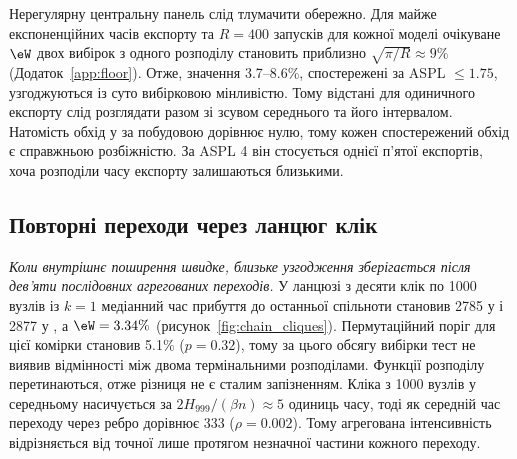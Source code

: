 Нерегулярну центральну панель слід тлумачити обережно. Для майже експоненційних часів експорту та $R=400$ запусків для кожної моделі очікуване $\eW$ двох вибірок з одного розподілу становить приблизно $\sqrt{\pi/R}\approx9\%$ (Додаток~\ref*{app:floor}). Отже, значення 3.7--8.6\%, спостережені за ASPL $\le1.75$, узгоджуються із суто вибірковою мінливістю. Тому відстані для одиничного експорту слід розглядати разом зі зсувом середнього та його інтервалом. Натомість обхід у \Full{} за побудовою дорівнює нулю, тому кожен спостережений обхід є справжньою розбіжністю. За ASPL 4 він стосується однієї п'ятої експортів, хоча розподіли часу експорту залишаються близькими.

\subsection{Повторні переходи через ланцюг клік}
\label{sec:res_cliques}

\emph{Коли внутрішнє поширення швидке, близьке узгодження зберігається після дев'яти послідовних агрегованих переходів.} У ланцюзі з десяти клік по 1000 вузлів із $k=1$ медіанний час прибуття до останньої спільноти становив 2785 у \Full{} і 2877 у \TS{}, а $\eW=3.34\%$ (рисунок~\ref{fig:chain_cliques}). Пермутаційний поріг для цієї комірки становив 5.1\% ($p=0.32$), тому за цього обсягу вибірки тест не виявив відмінності між двома термінальними розподілами. Функції розподілу перетинаються, отже різниця не є сталим запізненням. Кліка з 1000 вузлів у середньому насичується за $2H_{999}/(\beta n)\approx5$ одиниць часу, тоді як середній час переходу через ребро дорівнює 333 ($\rho=0.002$). Тому агрегована інтенсивність відрізняється від точної лише протягом незначної частини кожного переходу.

